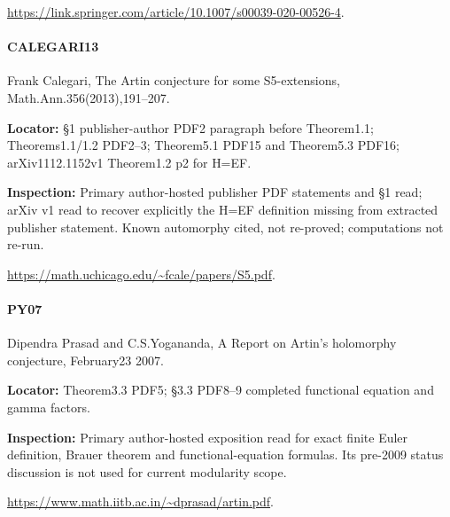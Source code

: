 \documentclass[11pt,a4paper]{article}
\begin{document}
\url{https://link.springer.com/article/10.1007/s00039-020-00526-4}.

\paragraph{CALEGARI13} Frank Calegari, The Artin conjecture for some S5-extensions, Math.\allowbreak{}Ann.\allowbreak{}356(2013),191–\allowbreak{}207.

\textbf{Locator:} §1 publisher-author PDF2 paragraph before Theorem1.\allowbreak{}1; Theorems1.\allowbreak{}1/\allowbreak{}1.\allowbreak{}2 PDF2–\allowbreak{}3; Theorem5.\allowbreak{}1 PDF15 and Theorem5.\allowbreak{}3 PDF16; arXiv1112.\allowbreak{}1152v1 Theorem1.\allowbreak{}2 p2 for H=EF.

\textbf{Inspection:} Primary author-hosted publisher PDF statements and §1 read; arXiv v1 read to recover explicitly the H=EF definition missing from extracted publisher statement.\allowbreak{} Known automorphy cited, not re-proved; computations not re-run.\allowbreak{}

\url{https://math.uchicago.edu/~fcale/papers/S5.pdf}.

\paragraph{PY07} Dipendra Prasad and C.\allowbreak{}S.\allowbreak{}Yogananda, A Report on Artin’s holomorphy conjecture, February23 2007.

\textbf{Locator:} Theorem3.\allowbreak{}3 PDF5; §3.\allowbreak{}3 PDF8–\allowbreak{}9 completed functional equation and gamma factors.

\textbf{Inspection:} Primary author-hosted exposition read for exact finite Euler definition, Brauer theorem and functional-equation formulas.\allowbreak{} Its pre-2009 status discussion is not used for current modularity scope.\allowbreak{}

\url{https://www.math.iitb.ac.in/~dprasad/artin.pdf}.
\end{document}
